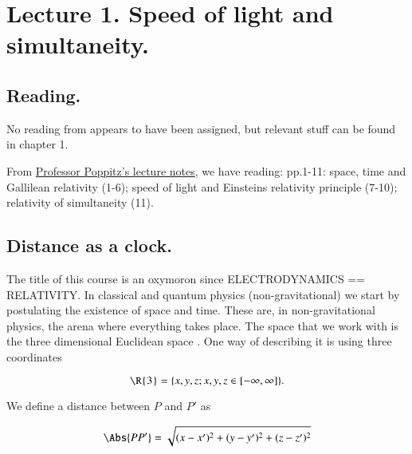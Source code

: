 %
%

\chapter{Lecture 1.  Speed of light and simultaneity.}
\label{chap:relativisticElectrodynamicsL1}
{}
\date{Jan 11, 2011}

\beginArtNoToc

\section{Reading.}

No reading from \cite{landau1980classical} appears to have been assigned, but relevant stuff can be found in chapter 1.

From \href{http://www.physics.utoronto.ca/~poppitz/e-poppitz/PHY450_files/RelEMp1-11.pdf}{Professor Poppitz's lecture notes}, we have reading: pp.1-11: space, time and Gallilean relativity (1-6); speed of light and Einsteins relativity principle (7-10); relativity of simultaneity (11).

\section{Distance as a clock.}

The title of this course is an oxymoron since ELECTRODYNAMICS == RELATIVITY.  In classical and quantum physics (non-gravitational) we start by postulating the existence of space and time.  These are, in non-gravitational physics, the arena where everything takes place.  The space that we work with is the three dimensional Euclidean space .  One way of describing it is using three coordinates

\begin{equation}\label{eqn:relativisticElectrodynamicsL1:10}
\text{\R{3}} = \{ x, y, z ; x,y,z \in [-\infty,\infty] \}.
\end{equation}

We define a distance between $P$ and $P'$ as

\begin{equation}\label{eqn:relativisticElectrodynamicsL1:20}
\Abs{P P' } = \sqrt{ (x-x')^2 + (y-y')^2 + (z-z')^2 }
\end{equation}

